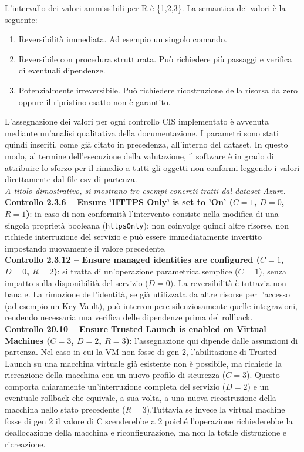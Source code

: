 \documentclass[a4paper,11pt]{report}
\begin{document}
\begin{itemize}
L'intervallo dei valori ammissibili per R è \{1,2,3\}. La semantica dei valori è la seguente:
\begin{enumerate}
\item Reversibilità immediata. Ad esempio un singolo comando.
\item Reversibile con procedura strutturata. Può richiedere più passaggi e verifica di eventuali dipendenze.
\item Potenzialmente irreversibile. Può richiedere ricostruzione della risorsa da zero oppure il ripristino esatto non è garantito.
\end{enumerate}
\end{itemize}


L'assegnazione dei valori per ogni controllo CIS implementato è avvenuta mediante un'analisi qualitativa della documentazione. I parametri sono stati quindi inseriti, come già citato in precedenza, all'interno del dataset. In questo modo, al termine dell'esecuzione della valutazione, il software è in grado di attribuire lo sforzo per il rimedio a tutti gli oggetti non conformi leggendo i valori direttamente dal file csv di partenza. \\

\textit{A titolo dimostrativo, si mostrano tre esempi concreti tratti dal dataset Azure.} \\

\textbf{Controllo 2.3.6 -- Ensure 'HTTPS Only' is set to 'On' ($C=1$, $D=0$, $R=1$)}: in caso di non conformità l'intervento consiste nella modifica di una singola proprietà booleana (\texttt{httpsOnly}); non coinvolge quindi altre risorse, non richiede interruzione del servizio e può essere immediatamente invertito impostando nuovamente il valore precedente. \\

\textbf{Controllo 2.3.12 -- Ensure managed identities are configured ($C=1$, $D=0$, $R=2$)}: si tratta di un'operazione parametrica semplice ($C=1$), senza impatto sulla disponibilità del servizio ($D=0$). La reversibilità è tuttavia non banale. La rimozione dell'identità, se già utilizzata da altre risorse per l'accesso (ad esempio un Key Vault), può interrompere silenziosamente quelle integrazioni, rendendo necessaria una verifica delle dipendenze prima del rollback. \\

\textbf{Controllo 20.10 -- Ensure Trusted Launch is enabled on Virtual Machines ($C=3$, $D=2$, $R=3$)}: l'assegnazione qui dipende dalle assunzioni di partenza. Nel caso in cui la VM non fosse di gen 2, l'abilitazione di Trusted Launch su una macchina virtuale già esistente non è possibile, ma richiede la ricreazione della macchina con un nuovo profilo di sicurezza ($C=3$). Questo comporta chiaramente un'interruzione completa del servizio ($D=2$) e un eventuale rollback che equivale, a sua volta, a una nuova ricostruzione della macchina nello stato precedente ($R=3$).Tuttavia se invece la virtual machine fosse di gen 2 il valore di C scenderebbe a 2 poiché l'operazione richiederebbe la deallocazione della macchina e riconfigurazione, ma non la totale distruzione e ricreazione.\\
\end{document}
